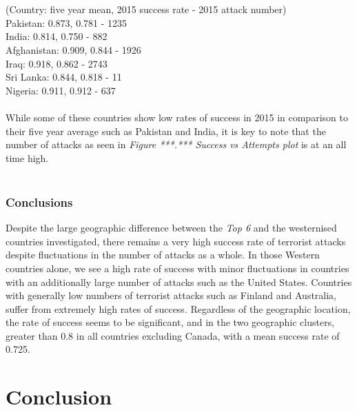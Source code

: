 \documentclass[10pt,a4paper]{article}
\begin{document}
\\\\
\indent \indent(Country: five year mean, 2015 success rate - 2015 attack number) \\
\indent Pakistan: 0.873,  0.781 - 1235  \\
\indent India: 0.814, 0.750 - 882 \\
\indent Afghanistan: 0.909, 0.844 - 1926 \\
\indent Iraq: 0.918, 0.862 - 2743 \\
\indent Sri Lanka: 0.844, 0.818 - 11 \\
\indent Nigeria: 0.911, 0.912 - 637 \\
\\
While some of these countries show low rates of success in 2015 in comparison to their five year average such as Pakistan and India, it is key to note that the number of attacks as seen in \textit{Figure ***.*** Success vs Attempts plot} is at an all time high.
\\\\ 
\subsubsection{Conclusions}
Despite the large geographic difference between the \textit{Top 6} and the westernised countries investigated, there remains a very high success rate of terrorist attacks despite fluctuations in the number of attacks as a whole.
In those Western countries alone, we see a high rate of success with minor fluctuations in countries with an additionally large number of attacks such as the United States.
Countries with generally low numbers of terrorist attacks such as Finland and Australia, suffer from extremely high rates of success.
Regardless of the geographic location, the rate of success seems to be significant, and in the two geographic clusters, greater than 0.8 in all countries excluding Canada, with a mean success rate of 0.725.


\section{Conclusion} 
\end{document}
